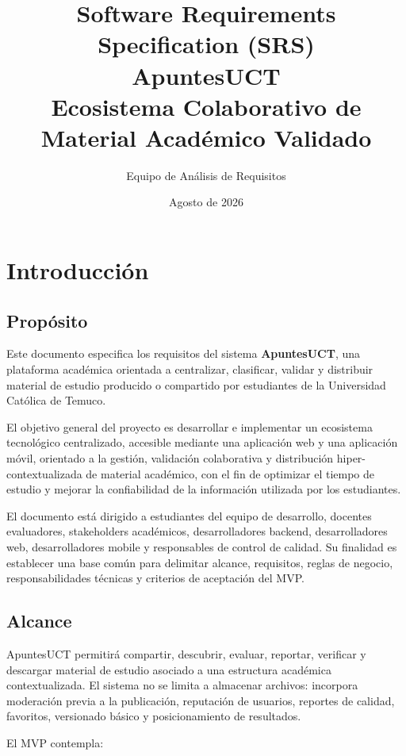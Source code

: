 \documentclass[12pt,a4paper]{article}
\title{Software Requirements Specification (SRS)\\
ApuntesUCT\\
\large Ecosistema Colaborativo de Material Académico Validado}
\author{Equipo de Análisis de Requisitos}
\date{Agosto de 2026}
\begin{document}
\maketitle
\tableofcontents
\newpage

\section{Introducción}

\subsection{Propósito}

Este documento especifica los requisitos del sistema \textbf{ApuntesUCT}, una plataforma académica orientada a centralizar, clasificar, validar y distribuir material de estudio producido o compartido por estudiantes de la Universidad Católica de Temuco.

El objetivo general del proyecto es desarrollar e implementar un ecosistema tecnológico centralizado, accesible mediante una aplicación web y una aplicación móvil, orientado a la gestión, validación colaborativa y distribución hiper-contextualizada de material académico, con el fin de optimizar el tiempo de estudio y mejorar la confiabilidad de la información utilizada por los estudiantes.

El documento está dirigido a estudiantes del equipo de desarrollo, docentes evaluadores, stakeholders académicos, desarrolladores backend, desarrolladores web, desarrolladores mobile y responsables de control de calidad. Su finalidad es establecer una base común para delimitar alcance, requisitos, reglas de negocio, responsabilidades técnicas y criterios de aceptación del MVP.

\subsection{Alcance}

ApuntesUCT permitirá compartir, descubrir, evaluar, reportar, verificar y descargar material de estudio asociado a una estructura académica contextualizada. El sistema no se limita a almacenar archivos: incorpora moderación previa a la publicación, reputación de usuarios, reportes de calidad, favoritos, versionado básico y posicionamiento de resultados.

El MVP contempla:
\end{document}
